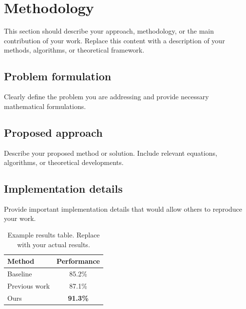 \section{Methodology}
\label{sec:methodology}

This section should describe your approach, methodology, or the main contribution of your work.
Replace this content with a description of your methods, algorithms, or theoretical framework.

\subsection{Problem formulation}

Clearly define the problem you are addressing and provide necessary mathematical formulations.

\subsection{Proposed approach}

Describe your proposed method or solution. Include relevant equations, algorithms, or theoretical developments.

\subsection{Implementation details}

Provide important implementation details that would allow others to reproduce your work.

\begin{table}
  \caption{Example results table. Replace with your actual results.}
  \label{tab:example}
  \centering
  \begin{tabular}{@{}lc@{}}
    \toprule
    Method & Performance \\
    \midrule
    Baseline & 85.2\% \\
    Previous work & 87.1\% \\
    Ours & \textbf{91.3\%}\\
    \bottomrule
  \end{tabular}
\end{table}